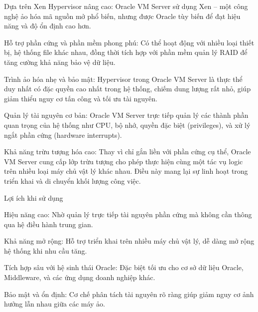 \begin{myitem}
\item Dựa trên Xen Hypervisor nâng cao: Oracle VM Server sử dụng Xen – một công nghệ ảo hóa mã nguồn mở phổ biến, nhưng được Oracle tùy biến để đạt hiệu năng và độ ổn định cao hơn.


\item Hỗ trợ phần cứng và phần mềm phong phú: Có thể hoạt động với nhiều loại thiết bị, hệ thống file khác nhau, đồng thời tích hợp với phần mềm quản lý RAID để tăng cường khả năng bảo vệ dữ liệu.


\item Trình ảo hóa nhẹ và bảo mật: Hypervisor trong Oracle VM Server là thực thể duy nhất có đặc quyền cao nhất trong hệ thống, chiếm dung lượng rất nhỏ, giúp giảm thiểu nguy cơ tấn công và tối ưu tài nguyên.


\item Quản lý tài nguyên cơ bản: Oracle VM Server trực tiếp quản lý các thành phần quan trọng của hệ thống như CPU, bộ nhớ, quyền đặc biệt (privileges), và xử lý ngắt phần cứng (hardware interrupts).


\item Khả năng trừu tượng hóa cao: Thay vì chỉ gắn liền với phần cứng cụ thể, Oracle VM Server cung cấp lớp trừu tượng cho phép thực hiện cùng một tác vụ logic trên nhiều loại máy chủ vật lý khác nhau. Điều này mang lại sự linh hoạt trong triển khai và di chuyển khối lượng công việc.
\end{myitem}

Lợi ích khi sử dụng
\begin{myitem}
\item Hiệu năng cao: Nhờ quản lý trực tiếp tài nguyên phần cứng mà không cần thông qua hệ điều hành trung gian.

\item Khả năng mở rộng: Hỗ trợ triển khai trên nhiều máy chủ vật lý, dễ dàng mở rộng hệ thống khi nhu cầu tăng.


\item Tích hợp sâu với hệ sinh thái Oracle: Đặc biệt tối ưu cho cơ sở dữ liệu Oracle, Middleware, và các ứng dụng doanh nghiệp khác.


\item Bảo mật và ổn định: Cơ chế phân tách tài nguyên rõ ràng giúp giảm nguy cơ ảnh hưởng lẫn nhau giữa các máy ảo.

\end{myitem}

